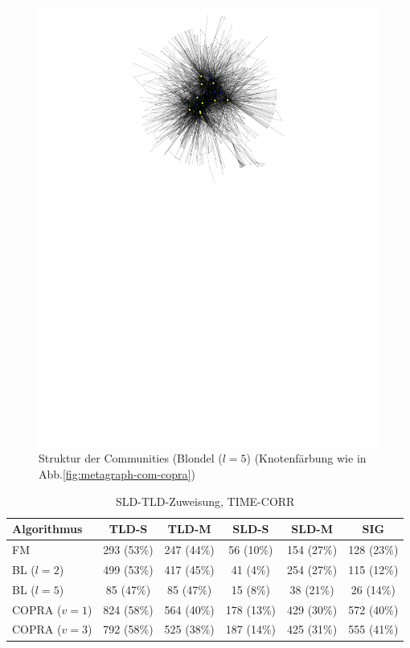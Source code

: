 \begin{figure}[h]
  \centering
  \includegraphics[scale=1.6]{images/metagraph-blondel2-minsize4.pdf}
  \caption{Struktur der Communities (Blondel ($l=5$) (Knotenf\"arbung
    wie in Abb.\ref{fig:metagraph-com-copra})}
  \label{fig:metagraph-com-blondel2}
\end{figure}

\begin{table}[t]
  \centering
  \footnotesize
  \begin{tabular}{l|c|c|c|c|c}
    Algorithmus & TLD-S & TLD-M & SLD-S & SLD-M & SIG \\
    \hline
    FM & 293 (53\%) & 247 (44\%) & 56 (10\%) & 154 (27\%) & 128
    (23\%) \\
    \hline
    BL ($l=2$) & 499 (53\%) & 417 (45\%) & 41 (4\%) & 254 (27\%) & 115 (12\%) \\
    BL ($l=5$) & 85 (47\%) & 85 (47\%) & 15 (8\%) & 38 (21\%) & 26 (14\%) \\
    \hline
    COPRA ($v=1$) & 824 (58\%) & 564 (40\%) & 178 (13\%) & 429 (30\%)
    & 572 (40\%) \\
    COPRA ($v=3$) & 792 (58\%) & 525 (38\%) & 187 (14\%) & 425 (31\%) & 555
    (41\%)
  \end{tabular}
  \caption{SLD-TLD-Zuweisung, TIME-CORR}
  \label{tab:assign}
\end{table}

